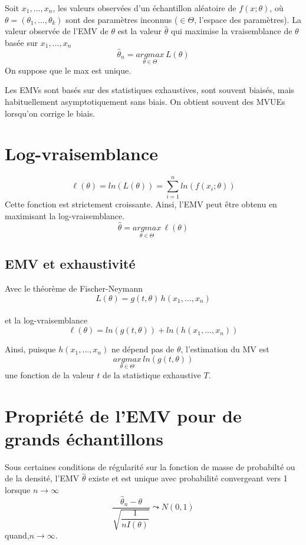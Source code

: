 \documentclass[]{book}
\theoremstyle{definition}
\theoremstyle{definition}
\theoremstyle{definition}
\theoremstyle{remark}
\begin{document}
Soit \(x_1,\dots,x_n\), les valeurs observées d'un échantillon aléatoire
de \(f(x;\theta)\), où \(\theta=(\theta_1,\dots,\theta_k)\) sont des
paramètres inconnus (\(\in \Theta\), l'espace des paramètres). La valeur
observée de l'EMV de \(\theta\) est la valeur \(\hat{\theta}\) qui
maximise la vraisemblance de \(\theta\) basée sur \(x_1,\dots,x_n\) \[
\hat{\theta}_n=\underset{\theta\in\Theta}{argmax}\,L(\theta)
\] On suppose que le max est unique.

Les EMVs sont basés sur des statistiques exhaustives, sont souvent
biaisés, mais habituellement asymptotiquement sans biais. On obtient
souvent des MVUEs lorsqu'on corrige le biais.

\section{Log-vraisemblance}\label{log-vraisemblance}

\[
\ell(\theta)=ln\left (L(\theta)\right )=\sum^n_{i=1} ln\left (f(x_i;\theta)\right )
\] Cette fonction est strictement croissante. Ainsi, l'EMV peut être
obtenu en maximisant la log-vraisemblance. \[
\hat{\theta}=\underset{\theta\in\Theta}{argmax}\,\ell(\theta)
\]

\subsection{EMV et exhaustivité}\label{emv-et-exhaustivite}

Avec le théorème de Fischer-Neymann \[
L(\theta)=g(t,\theta)\,h(x_1,\dots,x_n)
\]\\
et la log-vraisemblance \[
\ell(\theta)=ln(g(t,\theta))+ln(h(x_1,\dots,x_n))
\]

Ainsi, puisque \(h(x_1,\dots,x_n)\) ne dépend pas de \(\theta\),
l'estimation du MV est \[
\underset{\theta\in\Theta}{argmax}\, ln(g(t,\theta))
\] une fonction de la valeur \(t\) de la statistique exhaustive \(T\).

\section{Propriété de l'EMV pour de grands
échantillons}\label{propriete-de-lemv-pour-de-grands-echantillons}

Sous certaines conditions de régularité sur la fonction de masse de
probabilté ou de la densité, l'EMV \(\hat{\theta}\) existe et est unique
avec probabilité convergeant vers 1 lorsque \(n\rightarrow \infty\) \[
\dfrac{\hat{\theta}_n-\theta}{\sqrt{\dfrac{1}{nI(\theta)}}}\leadsto N(0,1)
\] quand,\(n\rightarrow\infty\).
\end{document}

